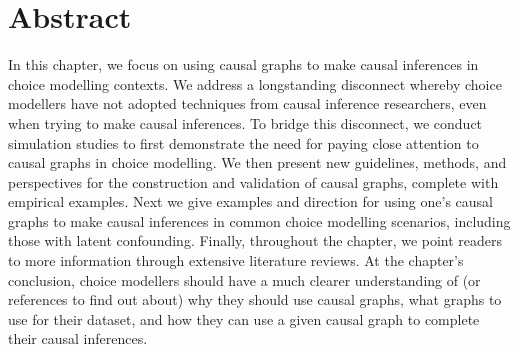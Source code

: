 \section*{Abstract}

In this chapter, we focus on using causal graphs to make causal inferences in choice modelling contexts.
We address a longstanding disconnect whereby choice modellers have not adopted techniques from causal inference researchers, even when trying to make causal inferences.
To bridge this disconnect, we conduct simulation studies to first demonstrate the need for paying close attention to causal graphs in choice modelling.
We then present new guidelines, methods, and perspectives for the construction and validation of causal graphs, complete with empirical examples.
Next we give examples and direction for using one's causal graphs to make causal inferences in common choice modelling scenarios, including those with latent confounding.
Finally, throughout the chapter, we point readers to more information through extensive literature reviews.
At the chapter's conclusion, choice modellers should have a much clearer understanding of (or references to find out about) why they should use causal graphs, what graphs to use for their dataset, and how they can use a given causal graph to complete their causal inferences.
